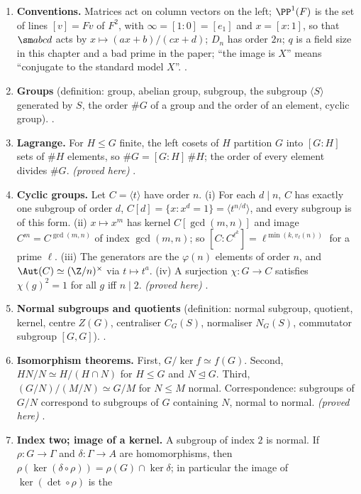 \begin{enumerate}[label=\textbf{\thechapter.\arabic*}]
\item \textbf{Conventions.} Matrices act on column vectors on the left; $\PP^1(F)$ is the set of lines $[v]=Fv$ of $F^2$,
with $\infty=[1:0]=[e_1]$ and $x=[x:1]$, so that $\sm abcd$ acts by $x\mapsto(ax+b)/(cx+d)$; $D_n$ has order $2n$; $q$ is a
field size in this chapter and a bad prime in the paper; ``the image is $X$'' means ``conjugate to the standard model
$X$''. .
\item \textbf{Groups} (definition: group, abelian group, subgroup, the subgroup $\langle S\rangle$ generated by $S$, the order $\#G$ of a group and the order
of an element, cyclic group). .
\item \textbf{Lagrange.} For $H\le G$ finite, the left cosets of $H$ partition $G$ into $[G:H]$ sets of $\#H$ elements, so
$\#G=[G:H]\,\#H$; the order of every element divides $\#G$. \emph{(proved here)} .
\item \textbf{Cyclic groups.} Let $C=\langle t\rangle$ have order $n$. (i) For each $d\mid n$, $C$ has exactly one subgroup of order $d$,
$C[d]=\{x:x^d=1\}=\langle t^{n/d}\rangle$, and every subgroup is of this form. (ii) $x\mapsto x^m$ has kernel $C[\gcd(m,n)]$ and
image $C^m=C^{\gcd(m,n)}$ of index $\gcd(m,n)$; so $[C:C^{\ell^k}]=\ell^{\min(k,v_\ell(n))}$ for a prime $\ell$. (iii) The generators
are the $\varphi(n)$ elements of order $n$, and $\Aut(C)\simeq(\Z/n)^\times$ via $t\mapsto t^a$. (iv) A surjection $\chi\colon G\to C$
satisfies $\chi(g)^2=1$ for all $g$ iff $n\mid 2$. \emph{(proved here)} .
\item \textbf{Normal subgroups and quotients} (definition: normal subgroup, quotient, kernel, centre $Z(G)$, centraliser $C_G(S)$,
normaliser $N_G(S)$, commutator subgroup $[G,G]$). .
\item \textbf{Isomorphism theorems.} First, $G/\ker f\simeq f(G)$. Second, $HN/N\simeq H/(H\cap N)$ for $H\le G$ and $N\trianglelefteq G$. Third,
$(G/N)/(M/N)\simeq G/M$ for $N\le M$ normal. Correspondence: subgroups of $G/N$ correspond to subgroups of $G$ containing $N$, normal to normal. \emph{(proved here)}
.
\item \textbf{Index two; image of a kernel.} A subgroup of index $2$ is normal. If $\rho\colon G\to\Gamma$ and $\delta\colon\Gamma\to A$ are
homomorphisms, then $\rho(\ker(\delta\circ\rho))=\rho(G)\cap\ker\delta$; in particular the image of $\ker(\det\circ\rho)$ is the

\end{enumerate}
